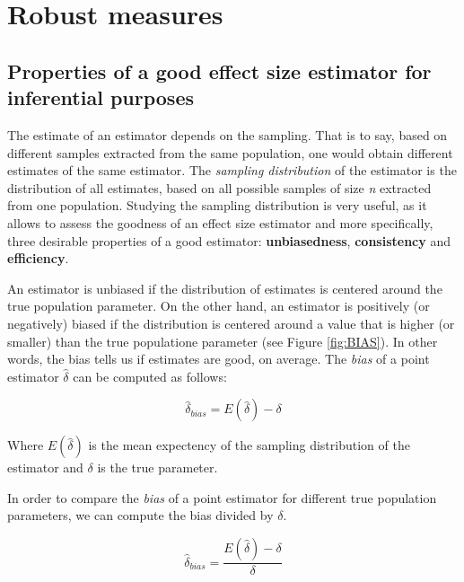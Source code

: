 \documentclass[man]{apa6}
\begin{document}
\hypertarget{robust-measures}{%
\section{Robust measures}\label{robust-measures}}

\hypertarget{properties-of-a-good-effect-size-estimator-for-inferential-purposes}{%
\subsection{Properties of a good effect size estimator for inferential purposes}\label{properties-of-a-good-effect-size-estimator-for-inferential-purposes}}

The estimate of an estimator depends on the sampling. That is to say, based on different samples extracted from the same population, one would obtain different estimates of the same estimator. The \emph{sampling distribution} of the estimator is the distribution of all estimates, based on all possible samples of size \emph{n} extracted from one population. Studying the sampling distribution is very useful, as it allows to assess the goodness of an effect size estimator and more specifically, three desirable properties of a good estimator: \textbf{unbiasedness}, \textbf{consistency} and \textbf{efficiency}.

An estimator is unbiased if the distribution of estimates is centered around the true population parameter. On the other hand, an estimator is positively (or negatively) biased if the distribution is centered around a value that is higher (or smaller) than the true populatione parameter (see Figure \ref{fig:BIAS}). In other words, the bias tells us if estimates are good, on average. The \emph{bias} of a point estimator \(\hat{\delta}\) can be computed as follows:

\begin{equation} 
\hat{\delta}_{bias}=E(\hat{\delta})-\delta
\label{eq:BIAS}
\end{equation}

Where \(E(\hat{\delta})\) is the mean expectency of the sampling distribution of the estimator and \(\delta\) is the true parameter.

In order to compare the \emph{bias} of a point estimator for different true population parameters, we can compute the bias divided by \(\delta\).

\begin{equation} 
\hat{\delta}_{bias}=\frac{E(\hat{\delta})-\delta}{\delta}
\label{eq:BIASRATE}
\end{equation}
\end{document}
